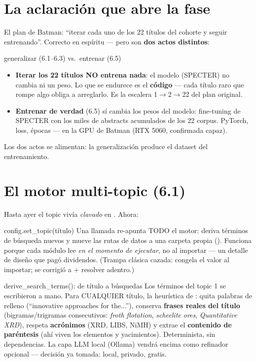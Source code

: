 \documentclass[11pt,a4paper]{article}
\begin{document}
\section{La aclaración que abre la fase}

El plan de Batman: ``iterar cada uno de los 22 títulos del cohorte y seguir entrenando''.
Correcto en espíritu — pero son \textbf{dos actos distintos}:

\begin{concepto}{generalizar (6.1--6.3) vs.\ entrenar (6.5)}
\begin{itemize}
  \item \textbf{Iterar los 22 títulos NO entrena nada}: el modelo (SPECTER) no cambia ni un
        peso. Lo que se endurece es el \textbf{código} — cada título raro que rompe algo
        obliga a arreglarlo. Es la escalera 1$\rightarrow$2$\rightarrow$22 del plan original.
  \item \textbf{Entrenar de verdad} (6.5) sí cambia los pesos del modelo: fine-tuning de
        SPECTER con los miles de abstracts acumulados de los 22 corpus. PyTorch, loss,
        épocas — en la GPU de Batman (RTX 5060, confirmada capaz).
\end{itemize}
Los dos actos se alimentan: la generalización produce el dataset del entrenamiento.
\end{concepto}

\section{El motor multi-topic (6.1)}

Hasta ayer el topic vivía \emph{clavado} en . Ahora:

\begin{concepto}{config.set\_topic(título)}
Una llamada re-apunta TODO el motor: deriva términos de búsqueda nuevos y mueve las rutas de
datos a una carpeta propia (). Funciona porque cada módulo
lee  \emph{en el momento de ejecutar}, no al importar — un detalle de
diseño que pagó dividendos. (Trampa clásica cazada:  congela
el valor al importar; se corrigió a  + resolver adentro.)
\end{concepto}

\begin{concepto}{derive\_search\_terms(): de título a búsquedas}
Los términos del topic 1 se escribieron a mano. Para CUALQUIER título, la heurística de
: quita palabras de relleno (``innovative approaches for the...''),
conserva \textbf{frases reales del título} (bigramas/trigramas consecutivos: \emph{froth
flotation}, \emph{scheelite ores}, \emph{Quantitative XRD}), respeta \textbf{acrónimos}
(XRD, LIBS, NiMH) y extrae el \textbf{contenido de paréntesis} (ahí viven los elementos y
yacimientos). Determinista, sin dependencias. La capa LLM local (Ollama) vendrá encima como
refinador opcional — decisión ya tomada: local, privado, gratis.
\end{concepto}
\end{document}
